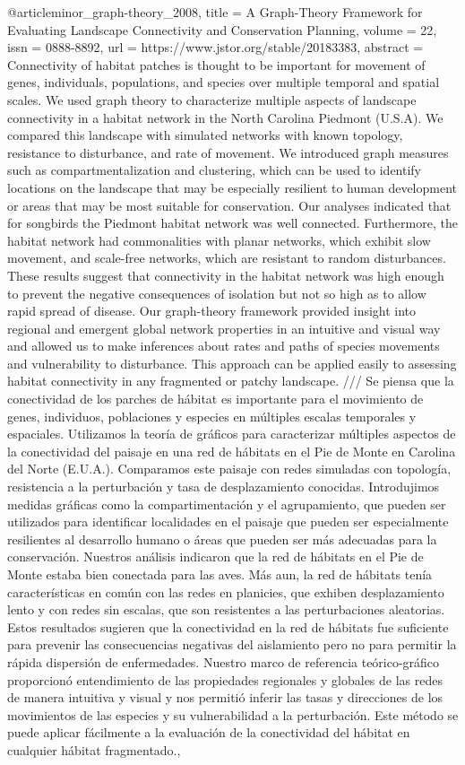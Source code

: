 {{{@article{minor_graph-theory_2008,
	title = {A {Graph}-{Theory} {Framework} for {Evaluating} {Landscape} {Connectivity} and {Conservation} {Planning}},
	volume = {22},
	issn = {0888-8892},
	url = {https://www.jstor.org/stable/20183383},
	abstract = {Connectivity of habitat patches is thought to be important for movement of genes, individuals, populations, and species over multiple temporal and spatial scales. We used graph theory to characterize multiple aspects of landscape connectivity in a habitat network in the North Carolina Piedmont (U.S.A). We compared this landscape with simulated networks with known topology, resistance to disturbance, and rate of movement. We introduced graph measures such as compartmentalization and clustering, which can be used to identify locations on the landscape that may be especially resilient to human development or areas that may be most suitable for conservation. Our analyses indicated that for songbirds the Piedmont habitat network was well connected. Furthermore, the habitat network had commonalities with planar networks, which exhibit slow movement, and scale-free networks, which are resistant to random disturbances. These results suggest that connectivity in the habitat network was high enough to prevent the negative consequences of isolation but not so high as to allow rapid spread of disease. Our graph-theory framework provided insight into regional and emergent global network properties in an intuitive and visual way and allowed us to make inferences about rates and paths of species movements and vulnerability to disturbance. This approach can be applied easily to assessing habitat connectivity in any fragmented or patchy landscape. /// Se piensa que la conectividad de los parches de hábitat es importante para el movimiento de genes, individuos, poblaciones y especies en múltiples escalas temporales y espaciales. Utilizamos la teoría de gráficos para caracterizar múltiples aspectos de la conectividad del paisaje en una red de hábitats en el Pie de Monte en Carolina del Norte (E.U.A.). Comparamos este paisaje con redes simuladas con topología, resistencia a la perturbación y tasa de desplazamiento conocidas. Introdujimos medidas gráficas como la compartimentación y el agrupamiento, que pueden ser utilizados para identificar localidades en el paisaje que pueden ser especialmente resilientes al desarrollo humano o áreas que pueden ser más adecuadas para la conservación. Nuestros análisis indicaron que la red de hábitats en el Pie de Monte estaba bien conectada para las aves. Más aun, la red de hábitats tenía características en común con las redes en planicies, que exhiben desplazamiento lento y con redes sin escalas, que son resistentes a las perturbaciones aleatorias. Estos resultados sugieren que la conectividad en la red de hábitats fue suficiente para prevenir las consecuencias negativas del aislamiento pero no para permitir la rápida dispersión de enfermedades. Nuestro marco de referencia teórico-gráfico proporcionó entendimiento de las propiedades regionales y globales de las redes de manera intuitiva y visual y nos permitió inferir las tasas y direcciones de los movimientos de las especies y su vulnerabilidad a la perturbación. Este método se puede aplicar fácilmente a la evaluación de la conectividad del hábitat en cualquier hábitat fragmentado.},
}}}}
